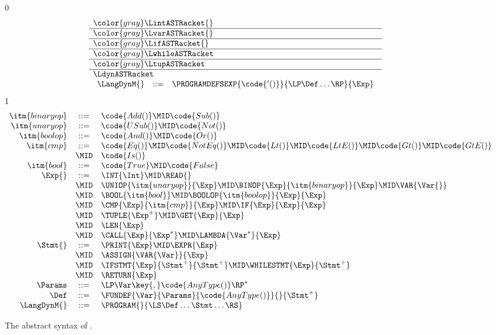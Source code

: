 \documentclass[7x10]{TimesAPriori_MIT}%
\newcommand{\gray}[1]{{\color{gray} #1}}
\def\racketEd{0}
\def\pythonEd{1}
\def\edition{0}
\numberwithin{theorem}{chapter}
\numberwithin{definition}{chapter}
\numberwithin{equation}{chapter}
\begin{document}
\begin{figure}[tp]
\centering
\begin{tcolorbox}[colback=white]
    \small
{\if\edition\racketEd
\[
\begin{array}{l}
  \gray{\LintASTRacket{}} \\ \hline
  \gray{\LvarASTRacket{}} \\ \hline
  \gray{\LifASTRacket{}} \\ \hline
  \gray{\LwhileASTRacket} \\ \hline
  \gray{\LtupASTRacket} \\  \hline
\LdynASTRacket \\
\begin{array}{lcl}
  \LangDynM{} &::=& \PROGRAMDEFSEXP{\code{'()}}{\LP\Def\ldots\RP}{\Exp} 
\end{array}
\end{array}
\]
\fi}
{\if\edition\pythonEd
\[
\begin{array}{rcl}
\itm{binaryop} &::= & \code{Add()} \MID \code{Sub()} \\
\itm{unaryop} &::= & \code{USub()} \MID \code{Not()} \\
\itm{boolop} &::=& \code{And()} \MID \code{Or()} \\
\itm{cmp} &::= & \code{Eq()} \MID \code{NotEq()} \MID \code{Lt()}
   \MID \code{LtE()} \MID \code{Gt()} \MID \code{GtE()} \\
   &\MID & \code{Is()} \\
\itm{bool} &::=& \code{True} \MID \code{False} \\
\Exp{} &::=& \INT{\Int} \MID \READ{} \\
  &\MID& \UNIOP{\itm{unaryop}}{\Exp}
    \MID  \BINOP{\Exp}{\itm{binaryop}}{\Exp}  
    \MID \VAR{\Var{}} \\
  &\MID& \BOOL{\itm{bool}} 
     \MID \BOOLOP{\itm{boolop}}{\Exp}{\Exp}\\
  &\MID& \CMP{\Exp}{\itm{cmp}}{\Exp}  \MID \IF{\Exp}{\Exp}{\Exp} \\
  &\MID& \TUPLE{\Exp^{+}} \MID \GET{\Exp}{\Exp} \\
  &\MID& \LEN{\Exp} \\
  &\MID& \CALL{\Exp}{\Exp^{*}} \MID \LAMBDA{\Var^{*}}{\Exp} \\
\Stmt{} &::=& \PRINT{\Exp} \MID \EXPR{\Exp} \\
  &\MID& \ASSIGN{\VAR{\Var}}{\Exp}\\
  &\MID& \IFSTMT{\Exp}{\Stmt^{+}}{\Stmt^{+}} 
  \MID \WHILESTMT{\Exp}{\Stmt^{+}}\\
  &\MID& \RETURN{\Exp} \\
\Params &::=& \LP\Var\key{,}\code{AnyType()}\RP^*   \\
\Def &::=& \FUNDEF{\Var}{\Params}{\code{AnyType()}}{}{\Stmt^{+}}  \\
\LangDynM{} &::=& \PROGRAM{}{\LS \Def \ldots \Stmt \ldots \RS}
\end{array}
\]
\fi}
\end{tcolorbox}

\caption{The abstract syntax of \LangDyn{}.}
\label{fig:r7-syntax}
\end{figure}
\end{document}
